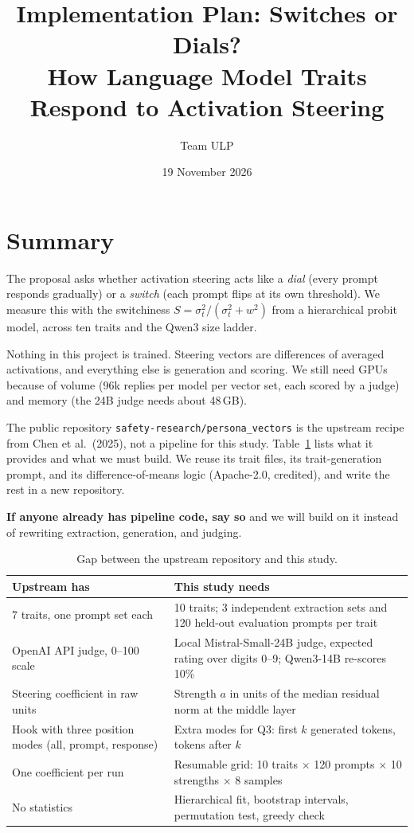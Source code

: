 \documentclass[11pt]{article}
\title{Implementation Plan: Switches or Dials?\\
\large How Language Model Traits Respond to Activation Steering}
\author{Team ULP}
\date{19 November 2026}
\begin{document}
\sloppy
\maketitle

\section{Summary}

The proposal asks whether activation steering acts like a \emph{dial} (every
prompt responds gradually) or a \emph{switch} (each prompt flips at its own
threshold). We measure this with the switchiness
$S = \sigma_t^2 / (\sigma_t^2 + w^2)$ from a hierarchical probit model, across
ten traits and the Qwen3 size ladder.

Nothing in this project is trained. Steering vectors are differences of
averaged activations, and everything else is generation and scoring. We still
need GPUs because of volume (96k replies per model per vector set, each scored
by a judge) and memory (the 24B judge needs about 48\,GB).

The public repository \texttt{safety-research/persona\_vectors} is the upstream
recipe from Chen et al.\ (2025), not a pipeline for this study.
Table~\ref{tab:gap} lists what it provides and what we must build. We reuse its
trait files, its trait-generation prompt, and its difference-of-means logic
(Apache-2.0, credited), and write the rest in a new repository.

\textbf{If anyone already has pipeline code, say so} and we will build on it
instead of rewriting extraction, generation, and judging.

\begin{table}[h]
\centering
\small
\begin{tabularx}{\textwidth}{@{}XX@{}}
\toprule
Upstream has & This study needs \\
\midrule
7 traits, one prompt set each &
10 traits; 3 independent extraction sets and 120 held-out evaluation prompts per trait \\
OpenAI API judge, 0--100 scale &
Local Mistral-Small-24B judge, expected rating over digits 0--9; Qwen3-14B re-scores 10\% \\
Steering coefficient in raw units &
Strength $a$ in units of the median residual norm at the middle layer \\
Hook with three position modes (all, prompt, response) &
Extra modes for Q3: first $k$ generated tokens, tokens after $k$ \\
One coefficient per run &
Resumable grid: 10 traits $\times$ 120 prompts $\times$ 10 strengths $\times$ 8 samples \\
No statistics &
Hierarchical fit, bootstrap intervals, permutation test, greedy check \\
\bottomrule
\end{tabularx}
\caption{Gap between the upstream repository and this study.}
\label{tab:gap}
\end{table}
\end{document}
